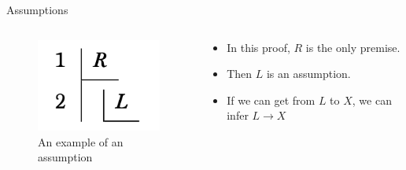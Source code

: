 \documentclass[
  ignorenonframetext,
]{beamer}
\providecommand{\tightlist}{%
  \setlength{\itemsep}{0pt}\setlength{\parskip}{0pt}}
\renewcommand{\,}{\text{, }}
\begin{document}
\begin{frame}{Assumptions}
\protect\hypertarget{assumptions-1}{}
\begin{columns}[c]
\begin{column}{0.48\textwidth}
\begin{figure}
\centering
\includegraphics{4_7b.png}
\caption{An example of an assumption}
\end{figure}
\end{column}

\begin{column}{0.48\textwidth}
\begin{itemize}
\tightlist
\item
  In this proof, \(R\) is the only premise.
\item
  Then \(L\) is an assumption.
\item
  If we can get from \(L\) to \(X\), we can infer \(L \rightarrow X\)
\end{itemize}
\end{column}
\end{columns}
\end{frame}
\end{document}
